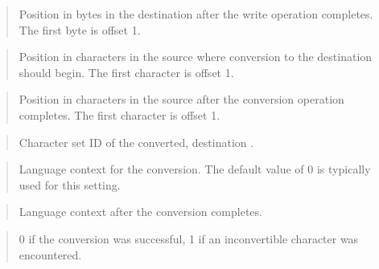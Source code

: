 \documentclass[letterpaper,10pt,english,openany,oneside]{sphinxmanual}
\begin{document}
\begin{quote}

Position in bytes in the destination  after the write operation
completes. The first byte is offset 1.
\end{quote}

\begin{quote}

Position in characters in the source  where conversion to the
destination  should begin. The first character is offset 1.
\end{quote}

\begin{quote}

Position in characters in the source  after the conversion operation
completes. The first character is offset 1.
\end{quote}

\begin{quote}

Character set ID of the converted, destination .
\end{quote}

\begin{quote}

Language context for the conversion. The default value of 0 is typically
used for this setting.
\end{quote}

\begin{quote}

Language context after the conversion completes.
\end{quote}

\begin{quote}

0 if the conversion was successful, 1 if an inconvertible character was
encountered.
\end{quote}

\newpage
\end{document}
